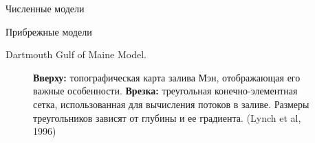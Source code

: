 \begin{chapter}{Численные модели}
\begin{section}{Прибрежные модели}
\begin{paragraph}{Dartmouth Gulf of Maine Model.}
\begin{figure}[t!]
\caption{\textbf{Вверху:} топографическая карта залива Мэн, отображающая 
его важные особенности.
\textbf{Врезка:} треугольная конечно-элементная сетка, использованная для
вычисления потоков в заливе. Размеры треугольников зависят от глубины и ее
градиента. (Lynch et al, 1996)}
\label{fig:GulfofMaine}
\end{figure}
%


\end{paragraph}
\end{section}
\end{chapter}
